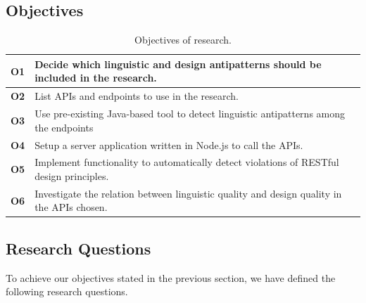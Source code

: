 \documentclass[a4paper,12pt]{article}
\begin{document}
\subsection{Objectives}


\begin{table}[!ht]
\begin{center}
\begin{tabular} {|p{1.2cm}|p{11.6cm}|} \hline
\textbf{O1} & Decide which linguistic and design antipatterns should be included in the research. \\ \hline
\textbf{O2} & List APIs and endpoints to use in the research. \\ \hline
\textbf{O3} & Use pre-existing Java-based tool to detect linguistic antipatterns among the endpoints \\ \hline
\textbf{O4} & Setup a server application written in Node.js to call the APIs. \\ \hline
\textbf{O5} & Implement functionality to automatically detect violations of RESTful design principles.\\ \hline
\textbf{O6} & Investigate the relation between linguistic quality and design quality in the APIs chosen. \\ \hline
\end{tabular}
    \caption{Objectives of research.}
    \label{tab:Objectives}
\end{center}    
\end{table}


\subsection{Research Questions}

To achieve our objectives stated in the previous section, we have defined the following research questions.
\end{document}
